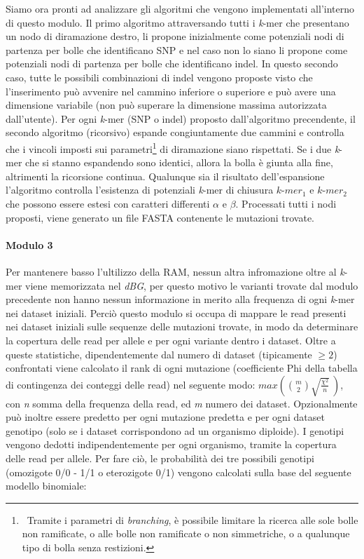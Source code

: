 \documentclass[../main.tex]{subfiles}
\begin{document}
\noindent
Siamo ora pronti ad analizzare gli algoritmi che vengono implementati all'interno di questo modulo. Il primo algoritmo attraversando tutti i \textit{k}-mer che presentano un nodo di diramazione destro, li propone inizialmente come potenziali nodi di partenza per bolle che identificano SNP e nel caso non lo siano li propone come potenziali nodi di partenza per bolle che identificano indel. In questo secondo caso, tutte le possibili combinazioni di indel vengono proposte visto che l'inserimento può avvenire nel cammino inferiore o superiore e può avere una dimensione variabile (non può superare la dimensione massima autorizzata dall'utente). Per ogni \textit{k}-mer (SNP o indel) proposto dall'algoritmo precendente, il secondo algoritmo (ricorsivo) espande congiuntamente due cammini e controlla che i vincoli imposti sui parametri\footnote{\ Tramite i parametri di \textit{branching}, è possibile limitare la ricerca alle sole bolle non ramificate, o alle bolle non ramificate o non simmetriche, o a qualunque tipo di bolla senza restizioni.} di diramazione siano rispettati. Se i due \textit{k}-mer che si stanno espandendo sono identici, allora la bolla è giunta alla fine, altrimenti la ricorsione continua. Qualunque sia il risultato dell'espansione l'algoritmo controlla l'esistenza di potenziali \textit{k}-mer di chiusura $k\texttt{-}mer_1$ e $k\texttt{-}mer_2$ che possono essere estesi con caratteri differenti $\alpha$ e $\beta$. Processati tutti i nodi proposti, viene generato un file FASTA contenente le mutazioni trovate.

\paragraph{Modulo 3} Per mantenere basso l'ultilizzo della RAM, nessun altra infromazione oltre al \textit{k}-mer viene memorizzata nel \textit{dBG}, per questo motivo le varianti trovate dal modulo precedente non hanno nessun informazione in merito alla frequenza di ogni \textit{k}-mer nei dataset iniziali. Perciò questo modulo si occupa di mappare le read presenti nei dataset iniziali sulle sequenze delle mutazioni trovate, in modo da determinare la copertura delle read per allele e per ogni variante dentro i dataset. Oltre a queste statistiche, dipendentemente dal numero di dataset (tipicamente $\geq2$) confrontati viene calcolato il rank di ogni mutazione (coefficiente Phi della tabella di contingenza dei conteggi delle read) nel seguente modo: $max\left( \binom{m}{2}\sqrt{\frac{\chi^2}{n}}\ \right)$, con \textit{n} somma della frequenza della read, ed \textit{m} numero dei dataset. Opzionalmente può inoltre essere predetto per ogni mutazione predetta e per ogni dataset genotipo (solo se i dataset corrispondono ad un organismo diploide). I genotipi vengono dedotti indipendentemente per ogni organismo, tramite la copertura delle read per allele. Per fare ciò, le probabilità dei tre possibili genotipi (omozigote 0/0 - 1/1 o eterozigote 0/1) vengono calcolati sulla base del seguente modello binomiale:
\end{document}
